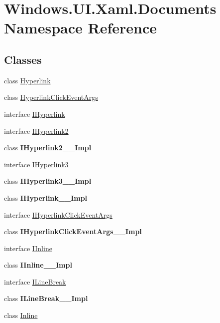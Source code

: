 \hypertarget{namespace_windows_1_1_u_i_1_1_xaml_1_1_documents}{}\section{Windows.\+U\+I.\+Xaml.\+Documents Namespace Reference}
\label{namespace_windows_1_1_u_i_1_1_xaml_1_1_documents}
\subsection*{Classes}
\begin{DoxyCompactItemize}
\item 
class \hyperlink{class_windows_1_1_u_i_1_1_xaml_1_1_documents_1_1_hyperlink}{Hyperlink}
\item 
class \hyperlink{class_windows_1_1_u_i_1_1_xaml_1_1_documents_1_1_hyperlink_click_event_args}{Hyperlink\+Click\+Event\+Args}
\item 
interface \hyperlink{interface_windows_1_1_u_i_1_1_xaml_1_1_documents_1_1_i_hyperlink}{I\+Hyperlink}
\item 
interface \hyperlink{interface_windows_1_1_u_i_1_1_xaml_1_1_documents_1_1_i_hyperlink2}{I\+Hyperlink2}
\item 
class {\bfseries I\+Hyperlink2\+\_\+\+\_\+\+Impl}
\item 
interface \hyperlink{interface_windows_1_1_u_i_1_1_xaml_1_1_documents_1_1_i_hyperlink3}{I\+Hyperlink3}
\item 
class {\bfseries I\+Hyperlink3\+\_\+\+\_\+\+Impl}
\item 
class {\bfseries I\+Hyperlink\+\_\+\+\_\+\+Impl}
\item 
interface \hyperlink{interface_windows_1_1_u_i_1_1_xaml_1_1_documents_1_1_i_hyperlink_click_event_args}{I\+Hyperlink\+Click\+Event\+Args}
\item 
class {\bfseries I\+Hyperlink\+Click\+Event\+Args\+\_\+\+\_\+\+Impl}
\item 
interface \hyperlink{interface_windows_1_1_u_i_1_1_xaml_1_1_documents_1_1_i_inline}{I\+Inline}
\item 
class {\bfseries I\+Inline\+\_\+\+\_\+\+Impl}
\item 
interface \hyperlink{interface_windows_1_1_u_i_1_1_xaml_1_1_documents_1_1_i_line_break}{I\+Line\+Break}
\item 
class {\bfseries I\+Line\+Break\+\_\+\+\_\+\+Impl}
\item 
class \hyperlink{class_windows_1_1_u_i_1_1_xaml_1_1_documents_1_1_inline}{Inline}

\end{DoxyCompactItemize}
